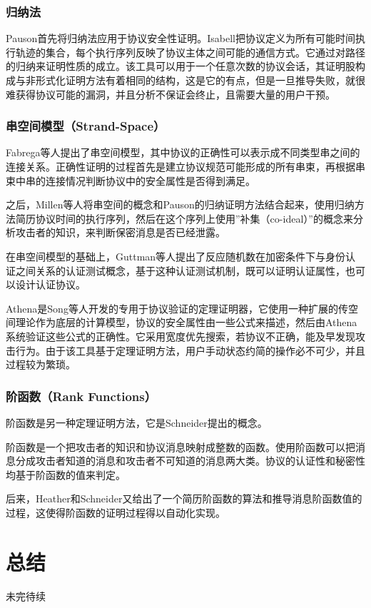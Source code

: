 \documentclass[cs4size,a4pape,UTF8]{ctexart}
\numberwithin{equation}{section}
\numberwithin{table}{section}
\numberwithin{figure}{section}
\begin{document}
\subsubsection{归纳法}
Pauson首先将归纳法应用于协议安全性证明。Isabell把协议定义为所有可能时间执行轨迹的集合，每个执行序列反映了协议主体之间可能的通信方式。它通过对路径的归纳来证明性质的成立。该工具可以用于一个任意次数的协议会话，其证明股构成与非形式化证明方法有着相同的结构，这是它的有点，但是一旦推导失败，就很难获得协议可能的漏洞，并且分析不保证会终止，且需要大量的用户干预。

\subsubsection{串空间模型（Strand-Space）}
Fabrega等人提出了串空间模型，其中协议的正确性可以表示成不同类型串之间的连接关系。正确性证明的过程首先是建立协议规范可能形成的所有串束，再根据串束中串的连接情况判断协议中的安全属性是否得到满足。

之后，Millen等人将串空间的概念和Pauson的归纳证明方法结合起来，使用归纳方法简历协议时间的执行序列，然后在这个序列上使用''补集（co-ideal）''的概念来分析攻击者的知识，来判断保密消息是否已经泄露。

在串空间模型的基础上，Guttman等人提出了反应随机数在加密条件下与身份认证之间关系的认证测试概念，基于这种认证测试机制，既可以证明认证属性，也可以设计认证协议。

Athena是Song等人开发的专用于协议验证的定理证明器，它使用一种扩展的传空间理论作为底层的计算模型，协议的安全属性由一些公式来描述，然后由Athena系统验证这些公式的正确性。它采用宽度优先搜索，若协议不正确，能及早发现攻击行为。由于该工具基于定理证明方法，用户手动状态约简的操作必不可少，并且过程较为繁琐。

\subsubsection{阶函数（Rank Functions）}
阶函数是另一种定理证明方法，它是Schneider提出的概念。

阶函数是一个把攻击者的知识和协议消息映射成整数的函数。使用阶函数可以把消息分成攻击者知道的消息和攻击者不可知道的消息两大类。协议的认证性和秘密性均基于阶函数的值来判定。

后来，Heather和Schneider又给出了一个简历阶函数的算法和推导消息阶函数值的过程，这使得阶函数的证明过程得以自动化实现。


\section{总结}
未完待续
\end{document}
